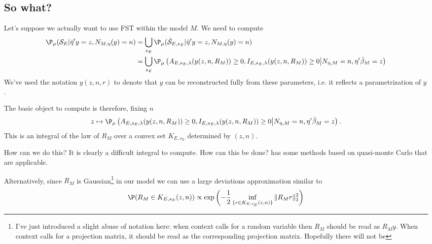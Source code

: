 \documentclass{article}
\newcommand{\OLS}{\bar{\beta}}
\begin{document}
        \subsection{So what?}

        Let's suppose we actually want to use FST within the model
        $M$.  We need to compute
        \begin{equation}
          \label{eq:selective:probability}
          \begin{aligned}
            \P_{\mu}({\cal S}_E | \bar{\eta}'y=z, N_{M,\eta}(y)=n) &=
            \bigcup_{s_E} \P_{\mu}(\bar{\cal S}_{E,s_E} | \bar{\eta}'y=z,
            N_{M,\eta}(y)=n) \\ &= \bigcup_{s_E} \P_{\mu}\left( A_{E,s_E,\lambda}(y(z,n,R_M)) \geq 0,
            I_{E,s_E,\lambda}(y(z,n,R_M)) \geq 0  \bigl | N_{\eta,M}=n, \eta'\OLS_M=z
            \right)
          \end{aligned}
          \end{equation}
        We've used the notation $y(z,n,r)$ to denote that $y$ can be
        reconstructed fully from these parameters, i.e. it reflects a
        parametrization of $y$.
        
        The basic object to compute is therefore, fixing $n$
        $$ z \mapsto \P_{\mu}\left( A_{E,s_E,\lambda}(y(z,n,R_M)) \geq 0, I_{E,s_E,\lambda}(y(z,n,R_M))
        \geq 0  \bigl | N_{\eta,M}=n, \eta'\OLS_M=z \right).
        $$ This is an integral of the law of $R_M$ over a convex set
        $K_{E,s_E}$ determined by $(z,n)$.

        How can we do this? It is clearly a difficult integral to
        compute. How can this be done? \cite{sifan} has some methods
        based on quasi-monte Carlo that are applicable.

        Alternatively, since $R_M$ is Gaussian\footnote{I've just
        introduced a slight abuse of notation here: when context calls
        for a random variable then $R_M$ should be read as
        $R_My$. When context calls for a projection matrix, it should
        be read as the corresponding projection matrix. Hopefully
        there will not be } in our model we can use a large deviations
        approximation similar to \cite{snigdha...}
        \begin{equation}
          \label{eq:LD}
        \P(R_M \in K_{E,s_E}(z,n)) \propto \exp\left(-\frac{1}{2}
        \inf_{\{r \in K_{E,s_E}(z,n)\}} \|R_Mr\|^2_2\right)
        \end{equation}
\end{document}
